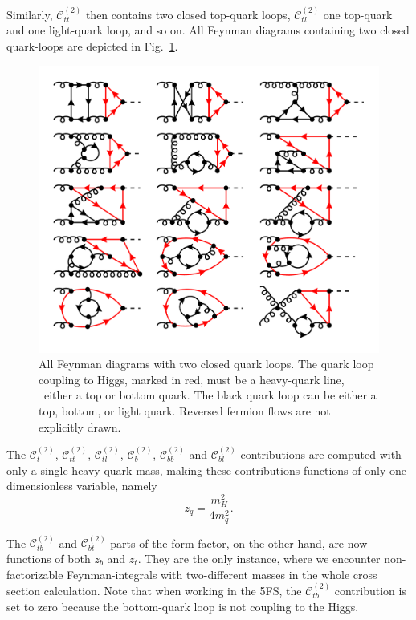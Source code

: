 Similarly, $\mathcal{C}_{tt}^{(2)}$ then contains two closed top-quark loops, $\mathcal{C}_{tl}^{(2)}$ one top-quark and one light-quark loop, and so on. All Feynman diagrams containing two closed quark-loops are depicted in Fig.~\ref{fig:5:C_tt}.
%
\begin{figure}[ht]
\centering
\includegraphics[width=\figurewidth]{Images/NNLO_Feynman_diagrams/C_tt.pdf}
\caption{All Feynman diagrams with two closed quark loops. The quark loop coupling to Higgs, marked in red, must be a heavy-quark line, \ie\ either a top or bottom quark. The black quark loop can be either a top, bottom, or light quark. Reversed fermion flows are not explicitly drawn.}
\label{fig:5:C_tt}
\end{figure}
The $\mathcal{C}_t^{(2)}$, $\mathcal{C}_{tt}^{(2)}$, $\mathcal{C}_{tl}^{(2)}$, $\mathcal{C}_b^{(2)}$, $\mathcal{C}_{bb}^{(2)}$ and $\mathcal{C}_{bl}^{(2)}$ contributions are computed with only a single heavy-quark mass, making these contributions functions of only one dimensionless variable, namely
\begin{equation}
z_q = \frac{m_H^2}{4 m_q^2}.
\end{equation}

The $\mathcal{C}_{tb}^{(2)}$ and $\mathcal{C}_{bt}^{(2)}$ parts of the form factor, on the other hand, are now functions of both $z_b$ and $z_t$. They are the only instance, where we encounter non-factorizable Feynman-integrals with two-different masses in the whole cross section calculation. Note that when working in the 5\acs{FS}, the $\mathcal{C}_{tb}^{(2)}$ contribution is set to zero because the bottom-quark loop is not coupling to the Higgs.

